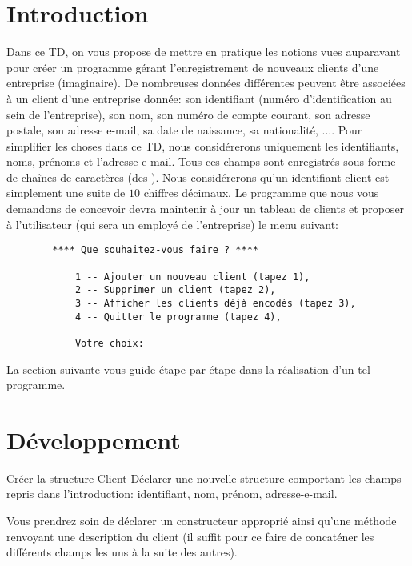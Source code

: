 \documentclass[a4paper,11pt]{article}
\date{2018 -- 2019}
\begin{document}
\entete
\titre
{}
\lastedit

\vspace{0.5cm}

	
\section{Introduction}

	Dans ce TD, on vous propose de mettre en pratique les notions vues auparavant pour créer un programme gérant l'enregistrement de nouveaux clients d'une entreprise (imaginaire). De nombreuses données différentes peuvent être associées à un client d'une entreprise donnée: son identifiant (numéro d'identification au sein de l'entreprise), son nom, son numéro de compte courant, son adresse postale, son adresse e-mail, sa date de naissance, sa nationalité, .... Pour simplifier les choses dans ce TD, nous considérerons uniquement les identifiants, noms, prénoms et l'adresse e-mail. Tous ces champs sont enregistr\'es sous forme de cha\^ines de caract\`eres (des ). Nous considérerons qu'un identifiant client est simplement une suite de $10$ chiffres d\'ecimaux.	
	Le programme que nous vous demandons de concevoir devra maintenir \`a jour un tableau de clients et proposer \`a l'utilisateur (qui sera un employ\'e de l'entreprise) le menu suivant:
	
	\begin{verbatim}
		**** Que souhaitez-vous faire ? ****
		
			1 -- Ajouter un nouveau client (tapez 1),
			2 -- Supprimer un client (tapez 2),
			3 -- Afficher les clients déjà encodés (tapez 3),
			4 -- Quitter le programme (tapez 4),
			
			Votre choix: 
	\end{verbatim}
	
La section suivante vous guide étape par étape dans la réalisation d'un tel programme.

\section{D\'eveloppement}


 	\begin{Exercice}{Créer la structure Client}
		D\'eclarer une nouvelle structure  comportant les champs repris dans l'introduction: identifiant, nom, prénom, adresse-e-mail.
		
		Vous prendrez soin de d\'eclarer un constructeur appropri\'e ainsi qu'une m\'ethode  renvoyant une description du client (il suffit pour ce faire de concat\'ener les diff\'erents champs les uns \`a la suite des autres).
		
	\end{Exercice} 
	
\end{document}
